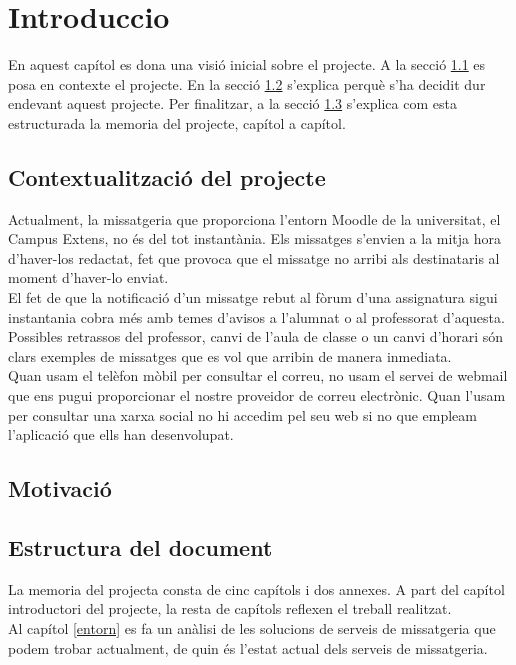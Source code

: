 \chapter{Introduccio}
En aquest capítol es dona una visió inicial sobre el projecte. A la secció \ref{contexte} es posa en contexte el projecte. En la secció \ref{motivacio} s'explica perquè s'ha decidit dur endevant aquest projecte. Per finalitzar, a la secció \ref{estructura_document} s'explica com esta estructurada la memoria del projecte, capítol a capítol.
\section{Contextualització del projecte}\label{contexte}
Actualment, la missatgeria que proporciona l'entorn Moodle de la universitat, el Campus Extens, no és del tot instantània. Els missatges s'envien a la mitja hora d'haver-los redactat, fet que provoca que el missatge no arribi als destinataris al moment d'haver-lo enviat. \\

El fet de que la notificació d'un missatge rebut al fòrum d'una assignatura sigui instantania cobra més amb temes d'avisos a l'alumnat o al professorat d'aquesta. Possibles retrassos del professor, canvi de l'aula de classe o un canvi d'horari són clars exemples de missatges que es vol que arribin de manera inmediata.\\

Quan usam el telèfon mòbil per consultar el correu, no usam el servei de webmail que ens pugui proporcionar el nostre proveidor de correu electrònic. Quan l'usam per consultar una xarxa social no hi accedim pel seu web si no que empleam l'aplicació que ells han desenvolupat. 

\section{Motivació}\label{motivacio}
 
\section{Estructura del document}\label{estructura_document}
La memoria del projecta consta de cinc capítols i dos annexes. A part del capítol introductori del projecte, la resta de capítols reflexen el treball realitzat.\\

Al  capítol \ref{entorn} es fa un anàlisi de les solucions de serveis de missatgeria que podem trobar actualment, de quin és l'estat actual dels serveis de missatgeria.\\

